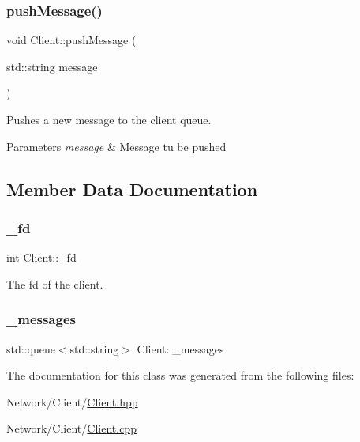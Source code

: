 \subsubsection{\texorpdfstring{pushMessage()}{pushMessage()}}
{\footnotesize\ttfamily void Client\+::push\+Message (\begin{DoxyParamCaption}\item[{std\+::string}]{message }\end{DoxyParamCaption})}



Pushes a new message to the client queue. 


\begin{DoxyParams}{Parameters}
{\em message} & Message tu be pushed \\
\hline
\end{DoxyParams}


\subsection{Member Data Documentation}
\mbox{\label{classClient_a76a7d1bb0a940f1b180ac251b47e6cf4}} 
\subsubsection{\texorpdfstring{\_fd}{\_fd}}
{\footnotesize\ttfamily int Client\+::\+\_\+fd\hspace{0.3cm}{\ttfamily [private]}}



The fd of the client. 

\mbox{\label{classClient_a5bbd57271ee0ee9a87a465621d1e669a}} 
\subsubsection{\texorpdfstring{\_messages}{\_messages}}
{\footnotesize\ttfamily std\+::queue$<$std\+::string$>$ Client\+::\+\_\+messages\hspace{0.3cm}{\ttfamily [private]}}



The documentation for this class was generated from the following files\+:\begin{DoxyCompactItemize}
\item 
Network/\+Client/\mbox{\hyperlink{Client_8hpp}{Client.\+hpp}}\item 
Network/\+Client/\mbox{\hyperlink{Client_8cpp}{Client.\+cpp}}\end{DoxyCompactItemize}

